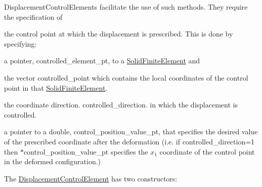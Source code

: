 {\ttfamily Displacement\+Control\+Elements} facilitate the use of such methods. They require the specification of
\begin{DoxyItemize}
\item the control point at which the displacement is prescribed. This is done by specifying\+:
\begin{DoxyItemize}
\item a pointer, {\ttfamily controlled\+\_\+element\+\_\+pt}, to a {\ttfamily \hyperlink{classoomph_1_1SolidFiniteElement}{Solid\+Finite\+Element}} and
\item the vector {\ttfamily controlled\+\_\+point} which contains the local coordinates of the control point in that {\ttfamily \hyperlink{classoomph_1_1SolidFiniteElement}{Solid\+Finite\+Element}}.
\end{DoxyItemize}
\item the coordinate direction. {\ttfamily controlled\+\_\+direction}. in which the displacement is controlled.
\item a pointer to a double, {\ttfamily control\+\_\+position\+\_\+value\+\_\+pt}, that specifies the desired value of the prescribed coordinate after the deformation (i.\+e. if {\ttfamily controlled\+\_\+direction=1} then {\ttfamily $\ast$control\+\_\+position\+\_\+value\+\_\+pt} specifies the $ x_1 $ coordinate of the control point in the deformed configuration.)
\end{DoxyItemize}The {\ttfamily \hyperlink{classoomph_1_1DisplacementControlElement}{Displacement\+Control\+Element}} has two constructors\+:
